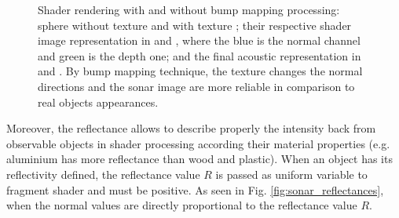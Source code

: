 \documentclass[final,5p,times]{elsarticle}
\begin{document}
\begin{figure}[ht]
{        \label{fig:bump_5}
    }
    \captionsetup{justification=centering}
    \caption{Shader rendering with and without bump mapping processing: sphere without texture  and with texture ; their respective shader image representation in  and , where the blue is the normal channel and green is the depth one; and the final acoustic representation in  and . By bump mapping technique, the texture changes the normal directions and the sonar image are more reliable in comparison to real objects appearances.}
    \label{fig:sonar_bump_mapping}
\end{figure}

Moreover, the reflectance allows to describe properly the intensity back from observable objects in shader processing according their material properties (e.g. aluminium has more reflectance than wood and plastic). When an object has its reflectivity defined, the reflectance value $R$ is passed as uniform variable to fragment shader and must be positive. As seen in Fig. \ref{fig:sonar_reflectances}, when the normal values are directly proportional to the reflectance value $R$.
\end{document}
